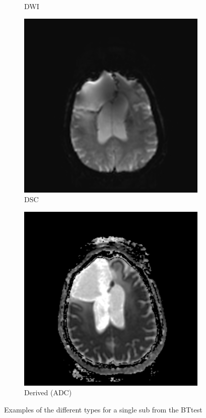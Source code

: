 \begin{figure}
\begin{subfigure}[t]{\figexamplewidth}
    \caption{\gls{DWI}}\label{fig:DWI}
\end{subfigure}
\begin{subfigure}[t]{\figexamplewidth}
    \centering
    \includegraphics[trim={0.5cm 0cm 0.5cm 1cm}, clip, width=\textwidth]{Figures/DSC}
    \caption{\gls{DSC}}\label{fig:PWI-DSC}
\end{subfigure}
\begin{subfigure}[t]{\figexamplewidth}
    \centering
    \includegraphics[trim={0.5cm 0cm 0.5cm 1cm}, clip, width=\textwidth]{Figures/DERIVED}
    \caption{Derived (ADC)}\label{fig:Derived}
\end{subfigure}
\caption{Examples of the different \glspl{type} for a single \gls{sub} from the \gls{BTtest}}\label{fig:seq_examples}
\end{figure}


